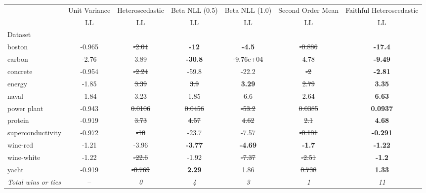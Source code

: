\begin{tabular}{l|c|c|c|c|c|c}
\toprule
{} & {Unit Variance} & {Heteroscedastic} & {Beta NLL (0.5)} & {Beta NLL (1.0)} & {Second Order Mean} & {Faithful Heteroscedastic} \\
{} & {LL} & {LL} & {LL} & {LL} & {LL} & {LL} \\
{Dataset} & {} & {} & {} & {} & {} & {} \\
\midrule
boston & -0.965 & \sout{-2.04} & \textbf{-12} & \textbf{-4.5} & \sout{-0.886} & \textbf{-17.4} \\
carbon & -2.76 & \sout{3.89} & \textbf{-30.8} & \sout{-9.76e+04} & \sout{4.78} & \textbf{-9.49} \\
concrete & -0.954 & \sout{-2.24} & -59.8 & -22.2 & \sout{-2} & \textbf{-2.81} \\
energy & -1.85 & \sout{3.39} & \sout{3.9} & \textbf{3.29} & \sout{2.79} & \textbf{3.35} \\
naval & -1.84 & \sout{3.23} & \sout{1.85} & \sout{6.6} & \sout{2.64} & \textbf{6.63} \\
power plant & -0.943 & \sout{0.0106} & \sout{0.0456} & \sout{-53.2} & \sout{0.0385} & \textbf{0.0937} \\
protein & -0.919 & \sout{3.73} & \sout{4.57} & \sout{4.62} & \sout{2.1} & \textbf{4.68} \\
superconductivity & -0.972 & \sout{-10} & -23.7 & -7.57 & \sout{-0.181} & \textbf{-0.291} \\
wine-red & -1.21 & -3.96 & \textbf{-3.77} & \textbf{-4.69} & \textbf{-1.7} & \textbf{-1.22} \\
wine-white & -1.22 & \sout{-22.6} & -1.92 & \sout{-7.37} & \sout{-2.51} & \textbf{-1.2} \\
yacht & -0.919 & \sout{-0.769} & \textbf{2.29} & 1.86 & \sout{0.738} & \textbf{1.33} \\
\textit{{Total wins or ties}} & -- & \textit{0} & \textit{4} & \textit{3} & \textit{1} & \textit{11} \\
\bottomrule
\end{tabular}
